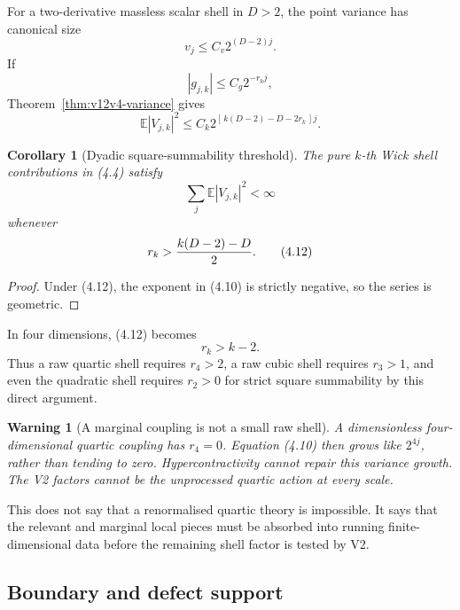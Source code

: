\documentclass[11pt]{article}
\newtheorem{corollary}[theorem]{Corollary}
\newtheorem{warning}[theorem]{Warning}
\theoremstyle{remark}
\begin{document}
For a two-derivative massless scalar shell in \(D>2\), the point
variance has canonical size
\[
                              v_j\le C_v2^{(D-2)j}.           \tag{4.8}
\]
If
\[
                              |g_{j,k}|\le C_g2^{-r_kj},     \tag{4.9}
\]
Theorem~\ref{thm:v12v4-variance} gives
\[
 \mathbb E|V_{j,k}|^2
 \le C_k
 2^{[\,k(D-2)-D-2r_k\,]j}.                                  \tag{4.10}
\]

\begin{corollary}[Dyadic square-summability threshold]
\label{cor:v12v4-threshold}
The pure \(k\)-th Wick shell contributions in (4.4) satisfy
\[
                              \sum_j\mathbb E|V_{j,k}|^2<\infty
                                                                    \tag{4.11}
\]
whenever
\[
                              r_k>{k(D-2)-D\over2}.           \tag{4.12}
\]
\end{corollary}

\begin{proof}
Under (4.12), the exponent in (4.10) is strictly negative, so the
series is geometric.
\end{proof}

In four dimensions, (4.12) becomes
\[
                              r_k>k-2.                       \tag{4.13}
\]
Thus a raw quartic shell requires \(r_4>2\), a raw cubic shell requires
\(r_3>1\), and even the quadratic shell requires \(r_2>0\) for strict
square summability by this direct argument.

\begin{warning}[A marginal coupling is not a small raw shell]
\label{warn:v12v4-marginal}
A dimensionless four-dimensional quartic coupling has \(r_4=0\).
Equation (4.10) then grows like \(2^{4j}\), rather than tending to
zero.  Hypercontractivity cannot repair this variance growth.
The V2 factors cannot be the unprocessed quartic action at every
scale.
\end{warning}

This does not say that a renormalised quartic theory is impossible.
It says that the relevant and marginal local pieces must be absorbed
into running finite-dimensional data before the remaining shell
factor is tested by V2.

\subsection{Boundary and defect support}
\end{document}
